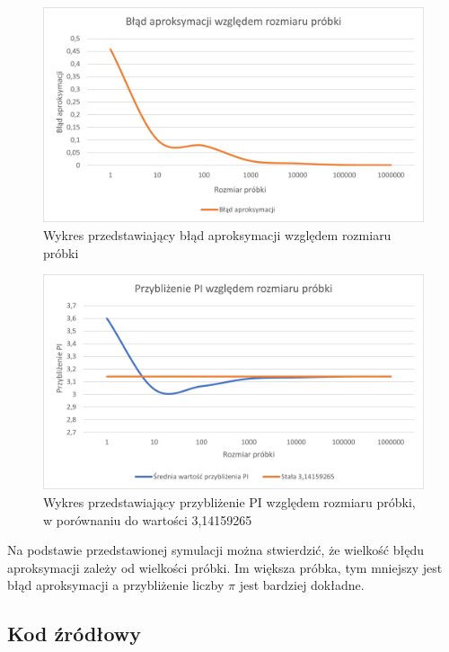 \documentclass[a4paper,11pt,titlepage]{article}
\begin{document}
\begin{figure}[H]
\centering
\includegraphics[width=1\columnwidth]{img/pi-excel.PNG}
\caption{Wykres przedstawiający błąd aproksymacji względem rozmiaru próbki}
\label{fig:pie1}
\end{figure}

\begin{figure}[H]
\centering
\includegraphics[width=1\columnwidth]{img/pi-excel2.PNG}
\caption{Wykres przedstawiający przybliżenie PI względem rozmiaru próbki, w porównaniu do wartości 3,14159265}
\label{fig:pie2}
\end{figure}

Na podstawie przedstawionej symulacji można stwierdzić, że wielkość błędu aproksymacji zależy od wielkości próbki. Im większa próbka, tym mniejszy jest błąd aproksymacji a przybliżenie liczby $\pi$ jest bardziej dokładne.

\subsection{Kod źródłowy}



\end{document}
